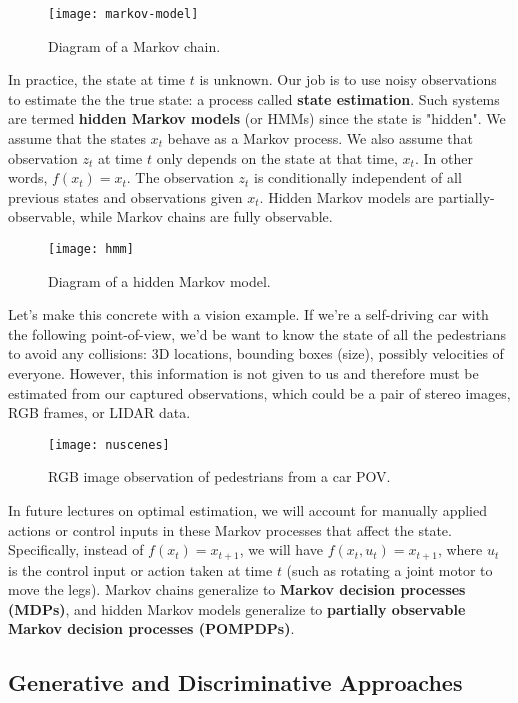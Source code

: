 \documentclass[12pt]{article}
\begin{document}
\begin{figure}[H]
  \caption{Diagram of a Markov chain.}
  \centering
\texttt{[image: markov-model]}
\end{figure}

In practice, the state at time $t$ is unknown. Our job is to use noisy observations to estimate the the true state: a process called \textbf{state estimation}. Such systems are termed \textbf{hidden Markov models} (or HMMs) since the state is "hidden". We assume that the states $x_{t}$ behave as a Markov process. We also assume that observation $z_{t}$ at time $t$ only depends on the state at that time, $x_{t}$. In other words, $f(x_{t}) = x_{t}$. The observation $z_{t}$ is conditionally independent of all previous states and observations given $x_{t}$. Hidden Markov models are partially-observable, while Markov chains are fully observable.

\begin{figure}[H]
  \caption{Diagram of a hidden Markov model.}
  \centering
\texttt{[image: hmm]}
\end{figure}

Let's make this concrete with a vision example. If we're a self-driving car with the following point-of-view, we'd be want to know the state of all the pedestrians to avoid any collisions: 3D locations, bounding boxes (size), possibly velocities of everyone. However, this information is not given to us and therefore must be estimated from our captured observations, which could be a pair of stereo images, RGB frames, or LIDAR data.

\begin{figure}[H]
  \caption{RGB image observation of pedestrians from a car POV.}
  \centering
\texttt{[image: nuscenes]}
\end{figure} 

In future lectures on optimal estimation, we will account for manually applied actions or control inputs in these Markov processes that affect the state. Specifically, instead of $f(x_{t}) = x_{t+1}$, we will have $f(x_{t}, u_{t}) = x_{t+1}$, where $u_{t}$ is the control input or action taken at time $t$ (such as rotating a joint motor to move the legs). Markov chains generalize to \textbf{Markov decision processes (MDPs)}, and hidden Markov models generalize to \textbf{partially observable Markov decision processes (POMPDPs)}.

\subsection*{Generative and Discriminative Approaches}
\end{document}
